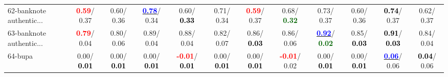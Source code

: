 \begin{table}[h]
\begin{center}
{\begin{tabular}{lc|c|c|c|c|c|c|c|c|c|c}
62-banknote authentic... & \textcolor{red}{\textbf{  0.59}}/  0.37 &   0.60/  0.36 & \underline{\textcolor{blue}{\textbf{  0.78}}}/  0.34 &   0.60/\textcolor{black}{\textbf{  0.33}} &   0.71/  0.34 & \textcolor{red}{\textbf{  0.59}}/  0.37 &   0.68/\textcolor{darkgreen}{\textbf{  0.32}} &   0.73/  0.37 &   0.60/  0.36 & \textcolor{black}{\textbf{  0.74}}/  0.37 &   0.62/  0.37 \\
63-banknote authentic... & \textcolor{red}{\textbf{  0.79}}/  0.04 &   0.80/  0.06 &   0.89/  0.04 &   0.88/  0.04 &   0.82/  0.07 &   0.86/\textcolor{black}{\textbf{  0.03}} &   0.86/  0.06 & \underline{\textcolor{blue}{\textbf{  0.92}}}/\textcolor{darkgreen}{\textbf{  0.02}} &   0.85/\textcolor{black}{\textbf{  0.03}} & \textcolor{black}{\textbf{  0.91}}/\textcolor{black}{\textbf{  0.03}} &   0.84/  0.04 \\
64-bupa &   0.00/\textcolor{black}{\textbf{  0.01}} &   0.00/\textcolor{black}{\textbf{  0.01}} &   0.00/\textcolor{black}{\textbf{  0.01}} & \textcolor{red}{\textbf{ -0.01}}/\textcolor{black}{\textbf{  0.01}} &   0.00/\textcolor{black}{\textbf{  0.01}} &   0.00/\textcolor{black}{\textbf{  0.01}} & \textcolor{red}{\textbf{ -0.01}}/  0.02 &   0.00/\textcolor{black}{\textbf{  0.01}} &   0.00/\textcolor{black}{\textbf{  0.01}} & \underline{\textcolor{blue}{\textbf{  0.06}}}/  0.06 & \textcolor{black}{\textbf{  0.04}}/  0.06 \\\end{tabular}}\label{stratsALCKappa1AllReduxHalfa}
\end{center}
\end{table}
